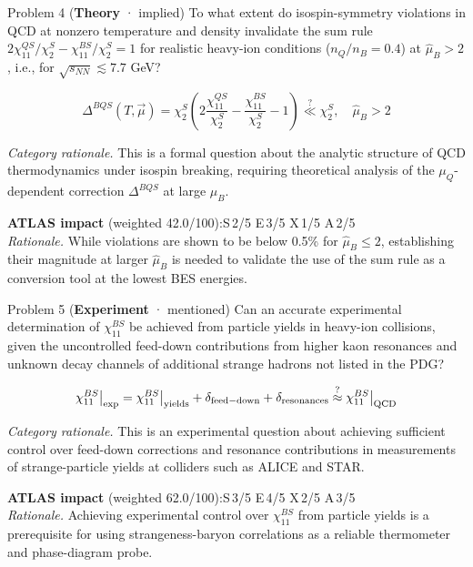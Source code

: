 \documentclass[11pt,letterpaper]{article}
\begin{document}
\begin{opbox}{Problem 4 \textnormal{\small(\textcolor{catTheory}{\textbf{Theory}} · implied)}}
To what extent do isospin-symmetry violations in QCD at nonzero temperature and density invalidate the sum rule $2\chi_{11}^{QS}/\chi_2^S - \chi_{11}^{BS}/\chi_2^S = 1$ for realistic heavy-ion conditions ($n_Q/n_B = 0.4$) at $\hat{\mu}_B > 2$, i.e., for $\sqrt{s_{NN}} \lesssim 7.7$ GeV?
\vspace{2pt}\begin{mathcap}\[\Delta^{BQS}(T,\vec{\mu}) = \chi_2^S\left(2\frac{\chi_{11}^{QS}}{\chi_2^S} - \frac{\chi_{11}^{BS}}{\chi_2^S} - 1\right) \stackrel{?}{\ll} \chi_2^S,\quad \hat{\mu}_B > 2\]\end{mathcap}
\vspace{3pt}
{\small\textit{Category rationale.} This is a formal question about the analytic structure of QCD thermodynamics under isospin breaking, requiring theoretical analysis of the $\mu_Q$-dependent correction $\Delta^{BQS}$ at large $\hat{\mu}_B$.}
\vspace{3pt}

{\footnotesize\textbf{ATLAS impact} (weighted 42.0/100):\quad S\,2/5 \quad E\,3/5 \quad X\,1/5 \quad A\,2/5\\
\textit{Rationale.} While violations are shown to be below 0.5\% for $\hat{\mu}_B \leq 2$, establishing their magnitude at larger $\hat{\mu}_B$ is needed to validate the use of the sum rule as a conversion tool at the lowest BES energies.}
\end{opbox}


\begin{opbox}{Problem 5 \textnormal{\small(\textcolor{catExp}{\textbf{Experiment}} · mentioned)}}
Can an accurate experimental determination of $\chi_{11}^{BS}$ be achieved from particle yields in heavy-ion collisions, given the uncontrolled feed-down contributions from higher kaon resonances and unknown decay channels of additional strange hadrons not listed in the PDG?
\vspace{2pt}\begin{mathcap}\[\chi_{11}^{BS}\big|_{\rm exp} = \chi_{11}^{BS}\big|_{\rm yields} + \delta_{\rm feed-down} + \delta_{\rm resonances} \stackrel{?}{\approx} \chi_{11}^{BS}\big|_{\rm QCD}\]\end{mathcap}
\vspace{3pt}
{\small\textit{Category rationale.} This is an experimental question about achieving sufficient control over feed-down corrections and resonance contributions in measurements of strange-particle yields at colliders such as ALICE and STAR.}
\vspace{3pt}

{\footnotesize\textbf{ATLAS impact} (weighted 62.0/100):\quad S\,3/5 \quad E\,4/5 \quad X\,2/5 \quad A\,3/5\\
\textit{Rationale.} Achieving experimental control over $\chi_{11}^{BS}$ from particle yields is a prerequisite for using strangeness-baryon correlations as a reliable thermometer and phase-diagram probe.}
\end{opbox}
\end{document}
